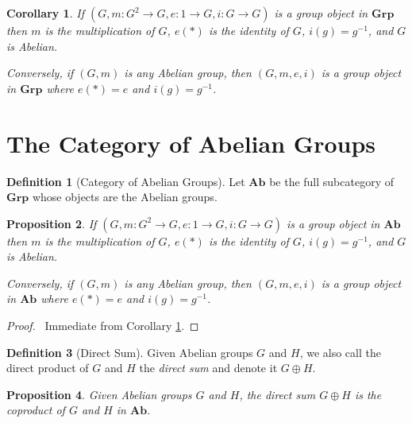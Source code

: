 \documentclass{book}
\let\qed\relax
\newtheorem{prop}{Proposition}[chapter]
\newtheorem{cor}{Corollary}[prop]
\theoremstyle{definition}
\newtheorem{df}[prop]{Definition}
\newcommand{\Ab}{\ensuremath{\mathbf{Ab}}}
\newcommand{\Grp}{\ensuremath{\mathbf{Grp}}}
\newcommand{\inv}[1]{\ensuremath{{#1}^{-1}}}
\begin{document}
\begin{cor}
\label{cor:group-in-group}
If $(G, m : G^2 \rightarrow G, e : 1 \rightarrow G, i : G \rightarrow G)$ is a group object in $\Grp$ then $m$ is the multiplication of $G$, $e(*)$ is the identity of $G$, $i(g) = \inv{g}$, and $G$ is Abelian.

Conversely, if $(G, m)$ is any Abelian group, then $(G,m,e,i)$ is a group object in $\Grp$ where $e(*) = e$ and $i(g) = \inv{g}$.
\end{cor}

\section{The Category of Abelian Groups}

\begin{df}[Category of Abelian Groups]
    Let $\Ab$ be the full subcategory of $\mathbf{Grp}$ whose objects are the Abelian groups.
\end{df}

\begin{prop}
If $(G, m : G^2 \rightarrow G, e : 1 \rightarrow G, i : G \rightarrow G)$ is a group object in $\Ab$ then $m$ is the multiplication of $G$, $e(*)$ is the identity of $G$, $i(g) = \inv{g}$, and $G$ is Abelian.

Conversely, if $(G, m)$ is any Abelian group, then $(G,m,e,i)$ is a group object in $\Ab$ where $e(*) = e$ and $i(g) = \inv{g}$.
\end{prop}

\begin{proof}
\pf\ Immediate from Corollary \ref{cor:group-in-group}. \qed
\end{proof}

\begin{df}[Direct Sum]
    Given Abelian groups $G$ and $H$, we also call the direct product of $G$ and $H$ the \emph{direct sum} and denote it $G \oplus H$.
\end{df}

\begin{prop}
    Given Abelian groups $G$ and $H$, the direct sum $G \oplus H$ is the coproduct of $G$ and $H$ in $\Ab$.
\end{prop}
\end{document}
